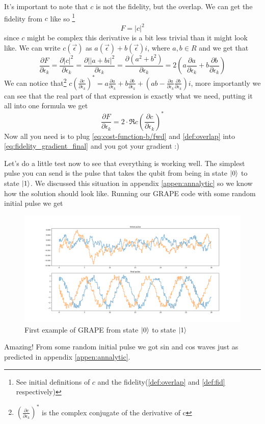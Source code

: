 \documentclass[english, a4paper, 12pt, twoside]{article}
\numberwithin{equation}{section} %
\begin{document}
It's important to note that $c$ is not the fidelity, but the overlap. We can get the fidelity from $c$ like so \footnote{See initial definitions of $c$ and the fidelity(\ref{def:overlap} and \ref{def:fid} respectively)}
\[
F = |c|^2
\]
since $c$ might be complex this derivative is a bit less trivial than it might look like. We can write $c(\vec{\epsilon})$ as $a(\vec{\epsilon}) + b(\vec{\epsilon})i$, where $a, b \in R$ and we get that 
\[
\frac{\partial F}{\partial \epsilon_k} = \frac{\partial |c|^2}{\partial \epsilon_k} = \frac{\partial ||a+bi|^2}{\partial \epsilon_k} = \frac{\partial (a^2 + b^2)}{\partial \epsilon_k} = 2(a\frac{\partial a}{\partial \epsilon_k} + b\frac{\partial b}{\partial \epsilon_k})
\]
We can notice that\footnote{$(\frac{\partial c}{\partial \epsilon_k})^*$ is the complex conjugate of the derivative of c} $c(\frac{\partial c}{\partial \epsilon_k})^* = a\frac{\partial a}{\partial \epsilon_k} + b\frac{\partial b}{\partial \epsilon_k} + (ab - \frac{\partial a}{\partial \epsilon_k}\frac{\partial b}{\partial \epsilon_k})i$, more importantly we can see that the real part of that expression is exactly what we need, putting it all into one formula we get
\begin{equation} \label{eq:fidelity_gradient_final}
    \frac{\partial F}{\partial \epsilon_k} = 2\cdot \Re{c(\frac{\partial c}{\partial \epsilon_k})^*}
\end{equation}
Now all you need is to plug \ref{eq:cost-function-b/fwd} and \ref{def:overlap} into \ref{eq:fidelity_gradient_final} and you got your gradient :)

Let's do a little test now to see that everything is working well. The simplest pulse you can send is the pulse that takes the qubit from being in state $\ket{0}$ to state $\ket{1}$. We discussed this situation in appendix \ref{appen:annalytic} so we know how the solution should look like. Running our GRAPE code with some random initial pulse we get
\begin{figure}[H]
    \centering
    \includegraphics[width=1\columnwidth]{Results/No-Constraints-single-qubit/pulses.png}
    \caption{First example of GRAPE from state $\ket{0}$ to state $\ket{1}$}
    \label{fig:GRAPE-first-example}
\end{figure}
Amazing! From some random initial pulse we got sin and cos waves just as predicted in appendix \ref{appen:annalytic}.
\end{document}
